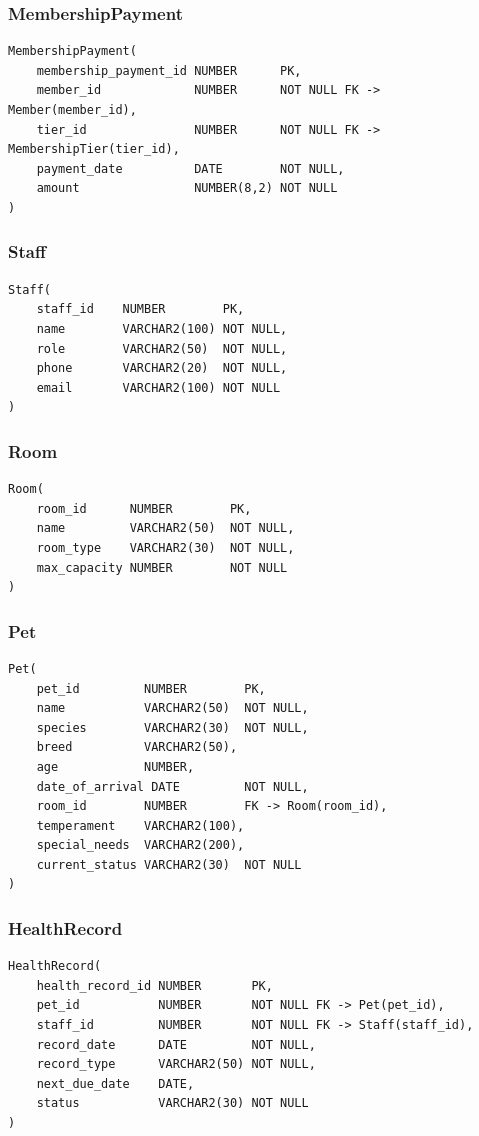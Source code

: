 \documentclass[11pt]{article}
\begin{document}
\subsubsection*{MembershipPayment}
\begin{verbatim}
MembershipPayment(
    membership_payment_id NUMBER      PK,
    member_id             NUMBER      NOT NULL FK -> Member(member_id),
    tier_id               NUMBER      NOT NULL FK -> MembershipTier(tier_id),
    payment_date          DATE        NOT NULL,
    amount                NUMBER(8,2) NOT NULL
)
\end{verbatim}

\subsubsection*{Staff}
\begin{verbatim}
Staff(
    staff_id    NUMBER        PK,
    name        VARCHAR2(100) NOT NULL,
    role        VARCHAR2(50)  NOT NULL,
    phone       VARCHAR2(20)  NOT NULL,
    email       VARCHAR2(100) NOT NULL
)
\end{verbatim}

\subsubsection*{Room}
\begin{verbatim}
Room(
    room_id      NUMBER        PK,
    name         VARCHAR2(50)  NOT NULL,
    room_type    VARCHAR2(30)  NOT NULL,
    max_capacity NUMBER        NOT NULL
)
\end{verbatim}

\subsubsection*{Pet}
\begin{verbatim}
Pet(
    pet_id         NUMBER        PK,
    name           VARCHAR2(50)  NOT NULL,
    species        VARCHAR2(30)  NOT NULL,
    breed          VARCHAR2(50),
    age            NUMBER,
    date_of_arrival DATE         NOT NULL,
    room_id        NUMBER        FK -> Room(room_id),
    temperament    VARCHAR2(100),
    special_needs  VARCHAR2(200),
    current_status VARCHAR2(30)  NOT NULL
)
\end{verbatim}

\subsubsection*{HealthRecord}
\begin{verbatim}
HealthRecord(
    health_record_id NUMBER       PK,
    pet_id           NUMBER       NOT NULL FK -> Pet(pet_id),
    staff_id         NUMBER       NOT NULL FK -> Staff(staff_id),
    record_date      DATE         NOT NULL,
    record_type      VARCHAR2(50) NOT NULL,
    next_due_date    DATE,
    status           VARCHAR2(30) NOT NULL
)
\end{verbatim}
\end{document}
